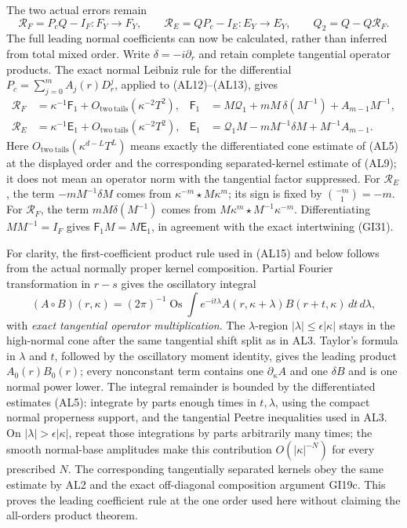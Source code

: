 \documentclass[
  11pt,
]{article}
\begin{document}
The two actual errors remain \[
 \mathcal R_F=P_cQ-I_F:F_Y\to F_Y,\qquad
 \mathcal R_E=QP_c-I_E:E_Y\to E_Y,
 \qquad Q_2=Q-Q\mathcal R_F .
 \tag{AL14}
\] The full leading normal coefficients can now be calculated, rather
than inferred from total mixed order. Write \(\delta=-i\partial_r\) and
retain complete tangential operator products. The exact normal Leibniz
rule for the differential \(P_c=\sum_{j=0}^mA_j(r)D_r^j\), applied to
(AL12)--(AL13), gives \[
 \begin{aligned}
 \mathcal R_F&=\kappa^{-1}\mathsf F_1+
       O_{\mathrm{two\ tails}}(\kappa^{-2}T^2),&
 \mathsf F_1&=M\mathcal Q_1+mM\,\delta(M^{-1})
                       +A_{m-1}M^{-1},\\
 \mathcal R_E&=\kappa^{-1}\mathsf E_1+
       O_{\mathrm{two\ tails}}(\kappa^{-2}T^2),&
 \mathsf E_1&=\mathcal Q_1M-mM^{-1}\delta M
                       +M^{-1}A_{m-1}.
 \end{aligned}
 \tag{AL15}
\] Here \(O_{\mathrm{two\ tails}}(\kappa^{d-L}T^L)\) means exactly the
differentiated cone estimate of (AL5) at the displayed order and the
corresponding separated-kernel estimate of (AL9); it does not mean an
operator norm with the tangential factor suppressed. For
\(\mathcal R_E\), the term \(-mM^{-1}\delta M\) comes from
\(\kappa^{-m}\star M\kappa^m\); its sign is fixed by
\(\binom{-m}{1}=-m\). For \(\mathcal R_F\), the term
\(mM\delta(M^{-1})\) comes from \(M\kappa^m\star M^{-1}\kappa^{-m}\).
Differentiating \(MM^{-1}=I_F\) gives \(\mathsf F_1M=M\mathsf E_1\), in
agreement with the exact intertwining (GI31).

For clarity, the first-coefficient product rule used in (AL15) and below
follows from the actual normally proper kernel composition. Partial
Fourier transformation in \(r-s\) gives the oscillatory integral \[
 (A\circ B)(r,\kappa)
 =(2\pi)^{-1}\operatorname{Os}\!\int
  e^{-it\lambda}A(r,\kappa+\lambda)B(r+t,\kappa)\,dt\,d\lambda,
 \tag{AL16}
\] with \emph{exact tangential operator multiplication}. The
\(\lambda\)-region \(|\lambda|\leq\epsilon|\kappa|\) stays in the
high-normal cone after the same tangential shift split as in AL3.
Taylor's formula in \(\lambda\) and \(t\), followed by the oscillatory
moment identity, gives the leading product \(A_0(r)B_0(r)\); every
nonconstant term contains one \(\partial_\kappa A\) and one \(\delta B\)
and is one normal power lower. The integral remainder is bounded by the
differentiated estimates (AL5): integrate by parts enough times in
\(t,\lambda\), using the compact normal properness support, and the
tangential Peetre inequalities used in AL3. On
\(|\lambda|>\epsilon|\kappa|\), repeat those integrations by parts
arbitrarily many times; the smooth normal-base amplitudes make this
contribution \(O(|\kappa|^{-N})\) for every prescribed \(N\). The
corresponding tangentially separated kernels obey the same estimate by
AL2 and the exact off-diagonal composition argument GI19c. This proves
the leading coefficient rule at the one order used here without claiming
the all-orders product theorem.
\end{document}
